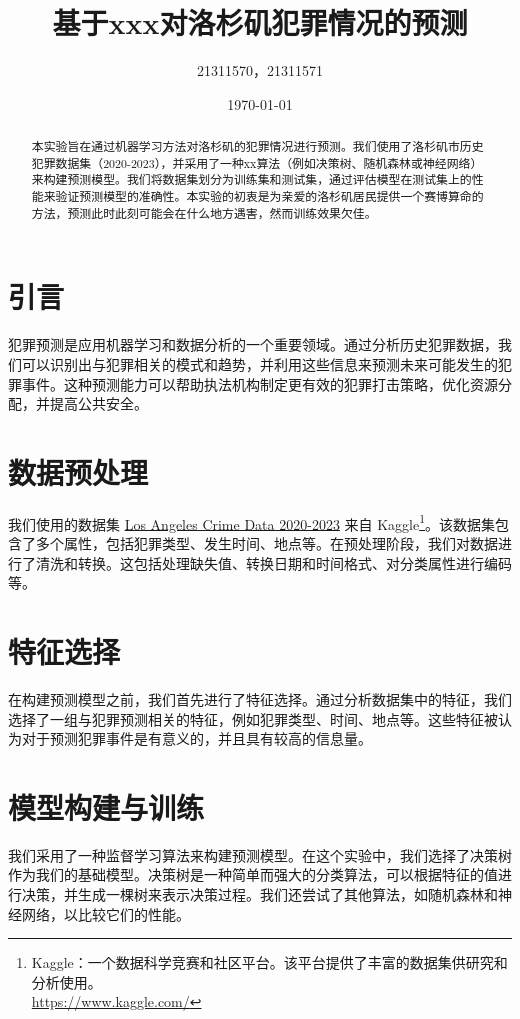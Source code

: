 \documentclass{article}
\begin{document}
\title{基于xxx对洛杉矶犯罪情况的预测}
\author{21311570，21311571}
\date{\today}

\maketitle

\renewcommand{\abstractname}{摘要}  %

\begin{abstract}
    本实验旨在通过机器学习方法对洛杉矶的犯罪情况进行预测。我们使用了洛杉矶市历史犯罪数据集（2020-2023），并采用了一种xx算法（例如决策树、随机森林或神经网络）来构建预测模型。我们将数据集划分为训练集和测试集，通过评估模型在测试集上的性能来验证预测模型的准确性。本实验的初衷是为亲爱的洛杉矶居民提供一个赛博算命的方法，预测此时此刻可能会在什么地方遇害，然而训练效果欠佳。
\end{abstract}

\section{引言}
犯罪预测是应用机器学习和数据分析的一个重要领域。通过分析历史犯罪数据，我们可以识别出与犯罪相关的模式和趋势，并利用这些信息来预测未来可能发生的犯罪事件。这种预测能力可以帮助执法机构制定更有效的犯罪打击策略，优化资源分配，并提高公共安全。

\section{数据预处理}
我们使用的数据集 \href{https://www.kaggle.com/datasets/asaniczka/crimes-in-los-angeles-2020-2023/data}{Los Angeles Crime Data 2020-2023} 来自 Kaggle\footnote{Kaggle：一个数据科学竞赛和社区平台。该平台提供了丰富的数据集供研究和分析使用。\\\url{https://www.kaggle.com/}}。该数据集包含了多个属性，包括犯罪类型、发生时间、地点等。在预处理阶段，我们对数据进行了清洗和转换。这包括处理缺失值、转换日期和时间格式、对分类属性进行编码等。

\section{特征选择}
在构建预测模型之前，我们首先进行了特征选择。通过分析数据集中的特征，我们选择了一组与犯罪预测相关的特征，例如犯罪类型、时间、地点等。这些特征被认为对于预测犯罪事件是有意义的，并且具有较高的信息量。

\section{模型构建与训练}
我们采用了一种监督学习算法来构建预测模型。在这个实验中，我们选择了决策树作为我们的基础模型。决策树是一种简单而强大的分类算法，可以根据特征的值进行决策，并生成一棵树来表示决策过程。我们还尝试了其他算法，如随机森林和神经网络，以比较它们的性能。
\end{document}
